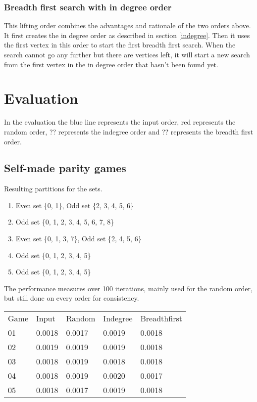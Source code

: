 \documentclass[10pt,a4paper]{article}
\begin{document}
\subsubsection{Breadth first search with in degree order}
This lifting order combines the advantages and rationale of the two orders above. It first creates the in degree order as described in section \ref{indegree}. Then it uses the first vertex in this order to start the first breadth first search. When the search cannot go any further but there are vertices left, it will start a new search from the first vertex in the in degree order that hasn't been found yet.

\section{Evaluation}\label{eval}

In the evaluation the blue line represents the input order, red represents the random order, ?? represents the indegree order and ?? represents the breadth first order.

\subsection{Self-made parity games}

Resulting partitions for the sets.

\begin{enumerate}[01]
	\item Even set \{0, 1\}, Odd set \{2, 3, 4, 5, 6\}
	\item Odd set \{0, 1, 2, 3, 4, 5, 6, 7, 8\}
	\item Even set \{0, 1, 3, 7\}, Odd set \{2, 4, 5, 6\}
	\item Odd set \{0, 1, 2, 3, 4, 5\}
	\item Odd set \{0, 1, 2, 3, 4, 5\}

\end{enumerate}

The performance measures over 100 iterations, mainly used for the random order, but still done on every order for consistency.

\begin{tabular}{l l l l l}
	Game	& Input	 & Random & Indegree & Breadthfirst \\
	01		& 0.0018 & 0.0017 & 0.0019   & 0.0018 \\
	02		& 0.0019 & 0.0019 & 0.0019   & 0.0018 \\
	03		& 0.0018 & 0.0019 & 0.0018 	 & 0.0018 \\
	04		& 0.0018 & 0.0019 & 0.0020	 & 0.0017 \\
	05		& 0.0018 & 0.0017 & 0.0019	 & 0.0018 

\end{tabular}
\end{document}

